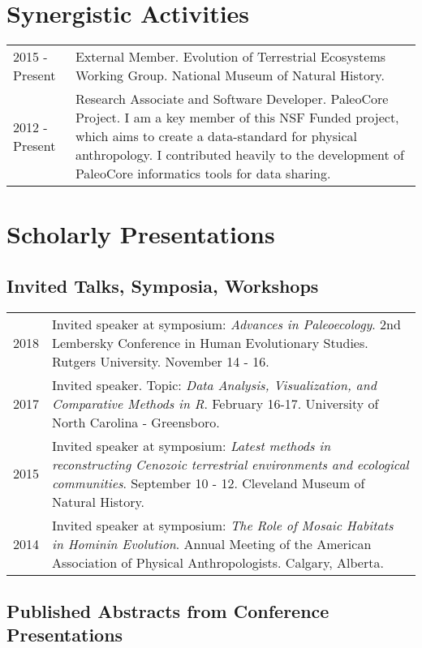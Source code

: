 \documentclass{article}
\begin{document}
\section*{Synergistic Activities}
\begin{tabular}{p{}p{}}

2015 - Present & External Member. Evolution of Terrestrial Ecosystems Working Group. National Museum of Natural History.\\[4pt]

2012 - Present & Research Associate and Software Developer. PaleoCore Project. I am a key member of this NSF Funded project, which aims to create a data-standard for physical anthropology. I contributed heavily to the development of PaleoCore informatics tools for data sharing.\\
\end{tabular}

\section*{Scholarly Presentations}
\subsection*{Invited Talks, Symposia, Workshops}

\begin{tabular}{p{}p{}}
2018 & Invited speaker at symposium: \emph{Advances in Paleoecology}. 2nd Lembersky Conference in Human Evolutionary Studies. Rutgers University. November 14 - 16.\\[4pt]
2017 & Invited speaker. Topic: \emph{Data Analysis, Visualization, and Comparative Methods in R}. February 16-17. University of North Carolina - Greensboro.\\[4pt]
2015 & Invited speaker at symposium: \emph{Latest methods in reconstructing Cenozoic terrestrial environments and ecological communities}. September 10 - 12. Cleveland Museum of Natural History.\\[4pt]
2014 & Invited speaker at symposium: \emph{The Role of Mosaic Habitats in Hominin Evolution}. Annual Meeting of the American Association of Physical Anthropologists. Calgary, Alberta.\\
\end{tabular}
\subsection*{Published Abstracts from Conference Presentations}
\end{document}
